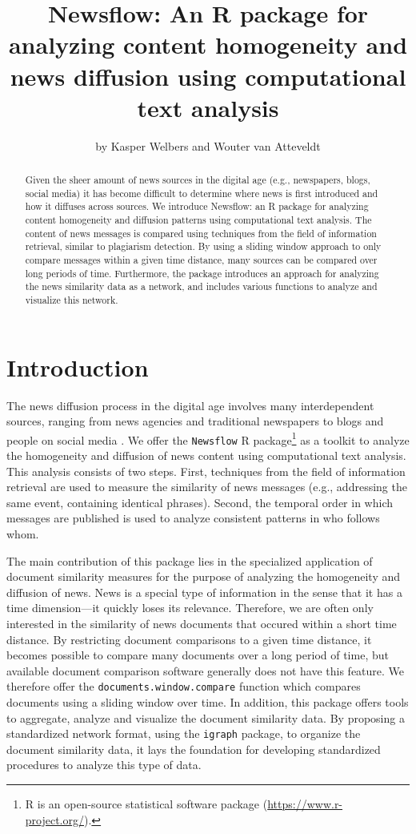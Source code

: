 \documentclass[]{article}
\title{Newsflow: An R package for analyzing content homogeneity and news
diffusion using computational text analysis}
\author{by Kasper Welbers and Wouter van Atteveldt}
\date{}
\let\rmarkdownfootnote\footnote%
\def\footnote{\protect\rmarkdownfootnote}
\begin{document}
\maketitle

\begin{abstract}
Given the sheer amount of news sources in the digital age (e.g.,
newspapers, blogs, social media) it has become difficult to determine
where news is first introduced and how it diffuses across sources. We
introduce Newsflow: an R package for analyzing content homogeneity and
diffusion patterns using computational text analysis. The content of
news messages is compared using techniques from the field of information
retrieval, similar to plagiarism detection. By using a sliding window
approach to only compare messages within a given time distance, many
sources can be compared over long periods of time. Furthermore, the
package introduces an approach for analyzing the news similarity data as
a network, and includes various functions to analyze and visualize this
network.
\end{abstract}

\section{Introduction}\label{introduction}

The news diffusion process in the digital age involves many
interdependent sources, ranging from news agencies and traditional
newspapers to blogs and people on social media
\citep{meraz11, paterson05, pew10}. We offer the \texttt{Newsflow} R
package\footnote{R is an open-source statistical software package
  (\url{https://www.r-project.org/}).} as a toolkit to analyze the
homogeneity and diffusion of news content using computational text
analysis. This analysis consists of two steps. First, techniques from
the field of information retrieval are used to measure the similarity of
news messages (e.g., addressing the same event, containing identical
phrases). Second, the temporal order in which messages are published is
used to analyze consistent patterns in who follows whom.

The main contribution of this package lies in the specialized
application of document similarity measures for the purpose of analyzing
the homogeneity and diffusion of news. News is a special type of
information in the sense that it has a time dimension---it quickly loses
its relevance. Therefore, we are often only interested in the similarity
of news documents that occured within a short time distance. By
restricting document comparisons to a given time distance, it becomes
possible to compare many documents over a long period of time, but
available document comparison software generally does not have this
feature. We therefore offer the \texttt{documents.window.compare}
function which compares documents using a sliding window over time. In
addition, this package offers tools to aggregate, analyze and visualize
the document similarity data. By proposing a standardized network
format, using the \texttt{igraph} package, to organize the document
similarity data, it lays the foundation for developing standardized
procedures to analyze this type of data.
\end{document}
